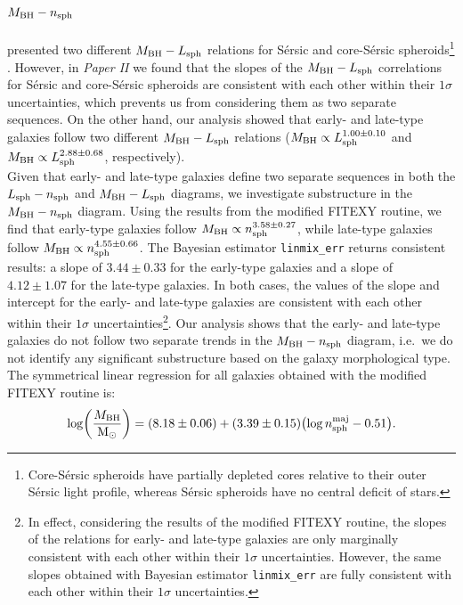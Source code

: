 \documentclass[preprint2]{emulateapj}
\begin{document}
\subsection{$M_{\rm BH} - n_{\rm sph}$}
\cite{grahamscott2013} presented two different $M_{\rm BH} - L_{\rm sph}$ relations for S\'ersic and core-S\'ersic 
spheroids\footnote{Core-S\'ersic spheroids have partially depleted cores relative to their outer S\'ersic light profile, 
whereas S\'ersic spheroids have no central deficit of stars. } \citep{graham2003coresersicmodel,trujillo2004coresersicmodel}.
However, in \emph{Paper II} we found that the slopes of the $M_{\rm BH} - L_{\rm sph}$ correlations for S\'ersic and core-S\'ersic spheroids 
are consistent with each other within their $1\sigma$ uncertainties, 
which prevents us from considering them as two separate sequences. 
On the other hand, our analysis showed that early- and late-type galaxies follow two different $M_{\rm BH} - L_{\rm sph}$ relations 
($M_{\rm BH} \propto L_{\rm sph}^{1.00 \pm 0.10}$ 
and $M_{\rm BH} \propto L_{\rm sph}^{2.88 \pm 0.68}$, respectively). \\
Given that early- and late-type galaxies define two separate sequences in both the $L_{\rm sph} - n_{\rm sph}$ 
and $M_{\rm BH} - L_{\rm sph}$ diagrams, 
we investigate substructure in the $M_{\rm BH} - n_{\rm sph}$ diagram. 
Using the results from the modified FITEXY routine, 
we find that 
early-type galaxies follow $M_{\rm BH} \propto n_{\rm sph}^{3.58 \pm 0.27}$, 
while late-type galaxies follow $M_{\rm BH} \propto n_{\rm sph}^{4.55 \pm 0.66}$. 
The Bayesian estimator {\tt linmix\_err} returns consistent results: 
a slope of $3.44 \pm 0.33$ for the early-type galaxies 
and a slope of $4.12 \pm 1.07$ for the late-type galaxies. 
In both cases, the values of the slope and intercept for the early- and late-type galaxies 
are consistent with each other within their $1\sigma$ uncertainties\footnote{In effect, 
considering the results of the modified FITEXY routine, 
the slopes of the relations for early- and late-type galaxies 
are only marginally consistent with each other within their $1\sigma$ uncertainties. 
However, the same slopes obtained with Bayesian estimator {\tt linmix\_err} 
are fully consistent with each other within their $1\sigma$ uncertainties. }.
Our analysis shows that the early- and late-type galaxies do not follow two separate trends in the $M_{\rm BH} - n_{\rm sph}$ diagram, 
i.e.~we do not identify any significant substructure based on the galaxy morphological type. \\
The symmetrical linear regression for all galaxies obtained with the modified FITEXY routine is: 
\begin{equation}
\log \biggl( \frac{M_{\rm BH}}{\rm M_\odot} \biggr) = (8.18 \pm 0.06) + (3.39 \pm 0.15) \bigl(\log n_{\rm sph}^{\rm maj} - 0.51 \bigr) .
\end{equation}
\end{document}
